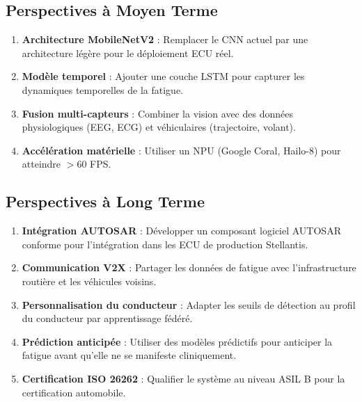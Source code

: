 \documentclass[12pt,a4paper,twoside]{report}
\begin{document}
\subsection{Perspectives à Moyen Terme}

\begin{enumerate}[leftmargin=2cm]
    \item \textbf{Architecture MobileNetV2} : Remplacer le CNN actuel par une architecture légère pour le déploiement ECU réel.
    \item \textbf{Modèle temporel} : Ajouter une couche LSTM pour capturer les dynamiques temporelles de la fatigue.
    \item \textbf{Fusion multi-capteurs} : Combiner la vision avec des données physiologiques (EEG, ECG) et véhiculaires (trajectoire, volant).
    \item \textbf{Accélération matérielle} : Utiliser un NPU (Google Coral, Hailo-8) pour atteindre $> 60$ FPS.
\end{enumerate}

\subsection{Perspectives à Long Terme}

\begin{enumerate}[leftmargin=2cm]
    \item \textbf{Intégration AUTOSAR} : Développer un composant logiciel AUTOSAR conforme pour l'intégration dans les ECU de production Stellantis.
    \item \textbf{Communication V2X} : Partager les données de fatigue avec l'infrastructure routière et les véhicules voisins.
    \item \textbf{Personnalisation du conducteur} : Adapter les seuils de détection au profil du conducteur par apprentissage fédéré.
    \item \textbf{Prédiction anticipée} : Utiliser des modèles prédictifs pour anticiper la fatigue avant qu'elle ne se manifeste cliniquement.
    \item \textbf{Certification ISO 26262} : Qualifier le système au niveau ASIL B pour la certification automobile.
\end{enumerate}

\vspace{1cm}

\begin{center}
\end{center}
\end{document}
